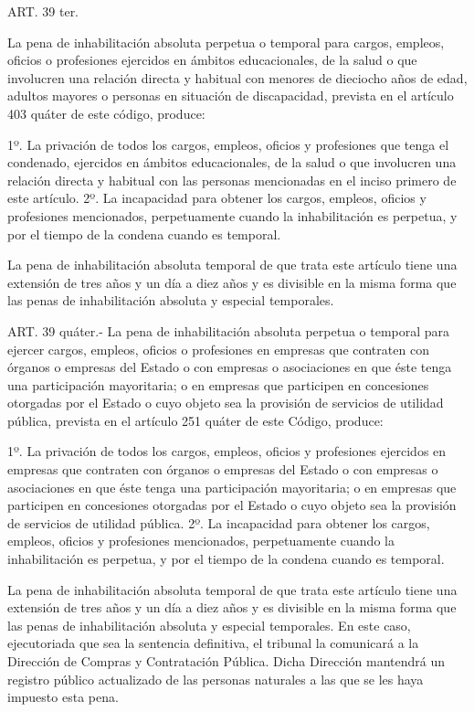     ART. 39 ter.

    La pena de inhabilitación absoluta perpetua o temporal para cargos, empleos, oficios o profesiones ejercidos en ámbitos educacionales, de la salud o que involucren una relación directa y habitual con menores de dieciocho años de edad, adultos mayores o personas en situación de discapacidad, prevista en el artículo 403 quáter de este código, produce:

    1º. La privación de todos los cargos, empleos, oficios y profesiones que tenga el condenado, ejercidos en ámbitos educacionales, de la salud o que involucren una relación directa y habitual con las personas mencionadas en el inciso primero de este artículo.
    2º. La incapacidad para obtener los cargos, empleos, oficios y profesiones mencionados, perpetuamente cuando la inhabilitación es perpetua, y por el tiempo de la condena cuando es temporal.

    La pena de inhabilitación absoluta temporal de que trata este artículo tiene una extensión de tres años y un día a diez años y es divisible en la misma forma que las penas de inhabilitación absoluta y especial temporales.




    ART. 39 quáter.- La pena de inhabilitación absoluta perpetua o temporal para ejercer cargos, empleos, oficios o profesiones en empresas que contraten con órganos o empresas del Estado o con empresas o asociaciones en que éste tenga una participación mayoritaria; o en empresas que participen en concesiones otorgadas por el Estado o cuyo objeto sea la provisión de servicios de utilidad pública, prevista en el artículo 251 quáter de este Código, produce:
     
    1º. La privación de todos los cargos, empleos, oficios y profesiones ejercidos en empresas que contraten con órganos o empresas del Estado o con empresas o asociaciones en que éste tenga una participación mayoritaria; o en empresas que participen en concesiones otorgadas por el Estado o cuyo objeto sea la provisión de servicios de utilidad pública.
    2º. La incapacidad para obtener los cargos, empleos, oficios y profesiones mencionados, perpetuamente cuando la inhabilitación es perpetua, y por el tiempo de la condena cuando es temporal.
     
    La pena de inhabilitación absoluta temporal de que trata este artículo tiene una extensión de tres años y un día a diez años y es divisible en la misma forma que las penas de inhabilitación absoluta y especial temporales.
    En este caso, ejecutoriada que sea la sentencia definitiva, el tribunal la comunicará a la Dirección de Compras y Contratación Pública. Dicha Dirección mantendrá un registro público actualizado de las personas naturales a las que se les haya impuesto esta pena.





